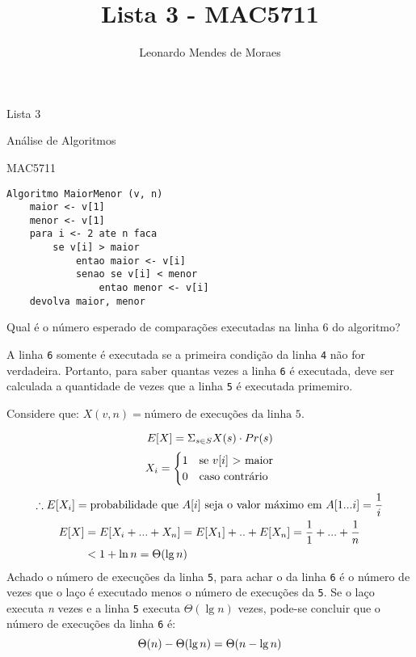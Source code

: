 \documentclass[12pt,a4paper]{article}
\author{Leonardo Mendes de Moraes }
\title{Lista 3 - MAC5711}
\date{}
\begin{document}
	\begin{center}
    {\huge Lista 3 \par} {\LARGE Análise de Algoritmos \par} {\Large MAC5711
    \par}
	\end{center}

    \begin{lstlisting}
Algoritmo MaiorMenor (v, n)
    maior <- v[1]
    menor <- v[1]
    para i <- 2 ate n faca
        se v[i] > maior
            entao maior <- v[i]
            senao se v[i] < menor
                entao menor <- v[i]
    devolva maior, menor
        \end{lstlisting}
     Qual é o número esperado de comparações executadas na linha 6
    do algoritmo?

    A linha \verb|6| somente é executada se a primeira condição da linha
    \verb|4| não for verdadeira. Portanto, para saber quantas vezes a linha
    \verb|6| é executada, deve ser calculada a quantidade de vezes que a linha
    \verb|5| é executada primemiro.

    Considere que: $X(v, n) = \text{número de execuções da linha 5}$.

    \begin{equation}
        E[X] = \Sigma_{s \in S} X(s) \cdot Pr(s) \\
        \notag
    \end{equation}
    \begin{equation}
        X_i =
            \begin{cases}
                1 & \text{se $v[i]$ > maior}\\
                0 & \text{caso contrário}
            \end{cases}
            \notag
    \end{equation}
    \begin{multline}
        \therefore E[X_i] = \text{probabilidade que $A[i]$ seja o valor máximo em $A[1...i]$}
        = \frac{1}{i} \\
        \begin{split}
        E[X] &= E[X_i + ... + X_n] = E[X_1] + .. + E[X_n] = \frac{1}{1} + ... + \frac{1}{n} \\
            &< 1 + \ln n = \Theta(\lg n)
    \end{split}
    \notag
    \end{multline}
    Achado o número de execuções da linha \verb|5|, para achar o da linha
    \verb|6| é o número de vezes que o laço é executado menos o número de
    execuções da \verb|5|. Se o laço executa \emph{n} vezes e a linha \verb|5|
    executa $\Theta(\lg n)$ vezes, pode-se concluir que o número de execuções da
    linha \verb|6| é:
    \begin{equation}
    \Theta(n) -\Theta(\lg n) = \Theta(n - \lg n)
    \notag
    \end{equation}
\end{document}
